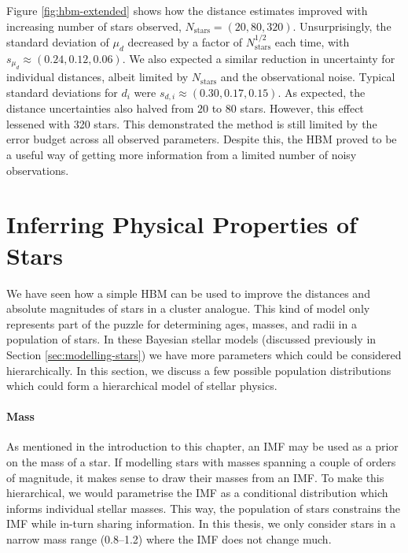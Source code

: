 Figure \ref{fig:hbm-extended} shows how the distance estimates improved with increasing number of stars observed, \(N_\mathrm{stars}=(20,80,320)\). Unsurprisingly, the standard deviation of \(\mu_d\) decreased by a factor of \(N_\mathrm{stars}^{1/2}\) each time, with \(s_{\mu_d} \approx (0.24, 0.12, 0.06)\). We also expected a similar reduction in uncertainty for individual distances, albeit limited by \(N_\mathrm{stars}\) and the observational noise. Typical standard deviations for \(d_i\) were \(s_{d,i} \approx (0.30, 0.17, 0.15)\). As expected, the distance uncertainties also halved from \(20\) to \(80\) stars. However, this effect lessened with 320 stars. This demonstrated the method is still limited by the error budget across all observed parameters. Despite this, the HBM proved to be a useful way of getting more information from a limited number of noisy observations. 

\section[Stellar Properties]{Inferring Physical Properties of Stars}\label{sec:hbm-phys}

We have seen how a simple HBM can be used to improve the distances and absolute magnitudes of stars in a cluster analogue. This kind of model only represents part of the puzzle for determining ages, masses, and radii in a population of stars. In these Bayesian stellar models (discussed previously in Section \ref{sec:modelling-stars}) we have more parameters which could be considered hierarchically. In this section, we discuss a few possible population distributions which could form a hierarchical model of stellar physics.

\paragraph{Mass} As mentioned in the introduction to this chapter, an IMF may be used as a prior on the mass of a star. If modelling stars with masses spanning a couple of orders of magnitude, it makes sense to draw their masses from an IMF. To make this hierarchical, we would parametrise the IMF as a conditional distribution which informs individual stellar masses. This way, the population of stars constrains the IMF while in-turn sharing information. In this thesis, we only consider stars in a narrow mass range (\SIrange{0.8}{1.2}{\solarmass}) where the IMF does not change much.

